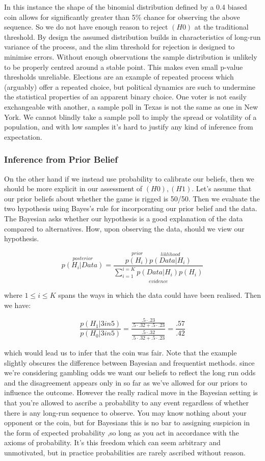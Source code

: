 \documentclass[10pt,a4paper,notitlepage, twocolumn]{article}
\begin{document}
In this instance the shape of the binomial distribution defined by a 0.4 biased coin allows for significantly greater than  5\% chance for observing the above sequence. So we do not have enough reason to reject $(H0)$ at the traditional threshold. By design the assumed distribution builds in characteristics of long-run variance of the process, and the slim threshold for rejection is designed to minimise errors. Without enough observations the sample distribution is unlikely to be properly centred around a stable point. This makes even small p-value thresholds unreliable. Elections are an example of repeated process which (arguably) offer a repeated choice, but political dynamics are such to undermine the statistical properties of an apparent binary choice. One voter is not easily exchangeable with another, a sample poll in Texas is not the same as one in New York. We cannot blindly take a sample poll to imply the spread or volatility of a population, and with low samples it's hard to justify any kind of inference from expectation.

\subsubsection*{Inference from Prior Belief}
On the other hand if we instead use probability to calibrate our beliefs, then we should be more explicit in our assessment of $(H0), (H1)$. Let's assume that our prior beliefs about whether the game is rigged is 50/50. Then we evaluate the two hypothesis using Bayes's rule for incorporating our prior belief and the data. The Bayesian asks whether our hypothesis is a good explanation of the data compared to alternatives. How, upon observing the data, should we view our hypothesis.

$$ \overset{posterior}{p(H_{i} | Data)} = \frac{\overset{prior}{p(H_{i})}\overset{liklihood}{p(Data | H_{i})}}{\underset{evidence}{\sum_{i=1}^{i =K} p(Data | H_{i})p(H_i)}}$$

where $ 1 \leq i \leq K$ spans the ways in which the data could have been realised. Then we have:

$$ \frac{p(H_1 | 3 in 5)}{p(H_{0} | 3 in 5)} = \frac{\frac{.5\cdot .23}{.5\cdot .32 + .5 \cdot .23}}{\frac{.5\cdot .32}{.5\cdot .32 + .5 \cdot .23}} = \frac{.57}{.42} $$

which would lead us to infer that the coin was fair. Note that the example slightly obscures the difference between Bayesian and frequentist methods. since we're considering gambling odds we want our beliefs to reflect the long run odds and the disagreement appears only in so far as we've allowed for our priors to influence the outcome. However the really radical move in the Bayesian setting is that you're allowed to ascribe a probability to any event regardless of whether there is any long-run sequence to observe. You may know nothing about your opponent or the coin, but for Bayesians this is no bar to assigning suspicion in the form of expected probability ,so long as you act in accordance with the axioms of probability. It's this freedom which can seem arbitrary and unmotivated, but in practice probabilities  are rarely ascribed without reason.
\end{document}
